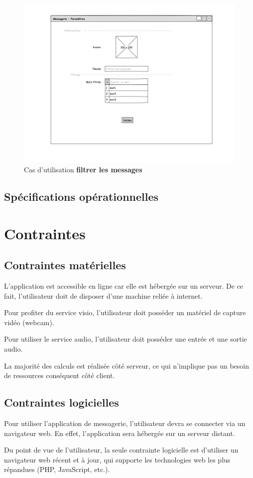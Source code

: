 \documentclass[11pt,dvipsnames,svgnames]{report}
\begin{document}
\begin{center}
\begin{figure}
\includegraphics[width=\textwidth]{maquette/maquette3.png}
\caption{Cas d'utilisation \textbf{filtrer les messages}}
\end{figure}
\end{center}


\section{Spécifications opérationnelles}

\chapter{Contraintes}
\section{Contraintes matérielles}
L'application est accessible en ligne car elle est hébergée sur un serveur. De ce fait, l'utilisateur doit de disposer d'une machine reliée à internet.

Pour profiter du service visio, l'utilisateur doit posséder un matériel de capture vidéo (webcam).

Pour utiliser le service audio, l'utilisateur doit posséder une entrée et une sortie audio.

La majorité des calculs est réalisée côté serveur, ce qui n'implique pas un besoin de ressources conséquent côté client.

\section{Contraintes logicielles}
Pour utiliser l'application de messagerie, l'utilisateur devra se connecter via un navigateur web. En effet, l'application sera hébergée sur un serveur distant. 

Du point de vue de l'utilisateur, la seule contrainte logicielle est d'utiliser un navigateur web récent et à jour, qui supporte les technologies web les plus répandues (PHP, JavaScript, etc.).
\end{document}
